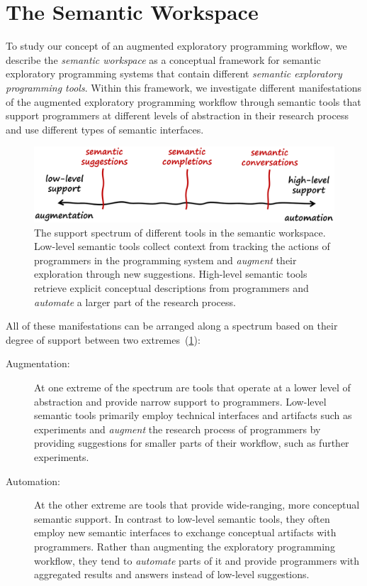
\section{The Semantic Workspace}
\label{sec:approach/workspace}

To study our concept of an augmented exploratory programming workflow, we describe the \emph{semantic workspace} as a conceptual framework for semantic exploratory programming systems that contain different \emph{semantic exploratory programming tools}.
Within this framework, we investigate different manifestations of the augmented exploratory programming workflow through semantic tools that support programmers at different levels of abstraction in their research process and use different types of semantic interfaces.

\begin{figure}
	\centering
	\includegraphics[width=.85\textwidth]{02_workspace/spectrum.png}
	\caption[The support spectrum of different \emph{semantic tools} in the semantic workspace.]{
		The support spectrum of different tools in the semantic workspace.
		Low-level semantic tools collect context from tracking the actions of programmers in the programming system and \emph{augment} their exploration through new suggestions.
		High-level semantic tools retrieve explicit conceptual descriptions from programmers and \emph{automate} a larger part of the research process.
	}
	\label{fig:approach/workspace/spectrum}
\end{figure}

All of these manifestations can be arranged along a spectrum based on their degree of support between two extremes~(\cref{fig:approach/workspace/spectrum}):

\begin{description}
	\item[Augmentation:]
	At one extreme of the spectrum are tools that operate at a lower level of abstraction and provide narrow support to programmers.
	Low-level semantic tools primarily employ technical interfaces and artifacts such as experiments and \emph{augment} the research process of programmers by providing suggestions for smaller parts of their workflow, such as further experiments.

	\item[Automation:]
	At the other extreme are tools that provide wide-ranging, more conceptual semantic support.
	In contrast to low-level semantic tools, they often employ new semantic interfaces to exchange conceptual artifacts with programmers.
	Rather than augmenting the exploratory programming workflow, they tend to \emph{automate} parts of it and provide programmers with aggregated results and answers instead of low-level suggestions.
\end{description}

